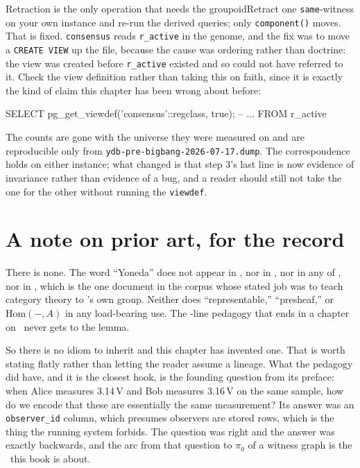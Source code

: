 \begin{Correspondence}{Retraction is the only operation that needs the groupoid}{Retract one \texttt{same}-witness on your own instance and re-run the derived queries; only \texttt{component()} moves.}
That is fixed. \texttt{consensus} reads \texttt{r\_active} in the genome, and the fix was to move a \texttt{CREATE VIEW} up the file, because the cause was ordering rather than doctrine: the view was created before \texttt{r\_active} existed and so could not have referred to it. Check the view definition rather than taking this on faith, since it is exactly the kind of claim this chapter has been wrong about before:

\begin{Check}
SELECT pg_get_viewdef('consensus'::regclass, true);   -- ... FROM r_active
\end{Check}

The counts are gone with the universe they were measured on and are reproducible only from \texttt{ydb-pre-bigbang-2026-07-17.dump}. The correspondence holds on either instance; what changed is that step 3's last line is now evidence of invariance rather than evidence of a bug, and a reader should still not take the one for the other without running the \texttt{viewdef}.
\end{Correspondence}

\section{A note on prior art, for the record}

There is none. The word ``Yoneda'' does not appear in \texttt{\labPriorDocA}, nor in \texttt{\labPriorDocB}, nor in any of \labPriorDrafts, nor in \texttt{\labPedagogyDoc}, which is the one document in the corpus whose stated job was to teach category theory to \labPI's own group. Neither does ``representable,'' ``presheaf,'' or $\mathrm{Hom}(-,A)$ in any load-bearing use. The \labPedagogyLines-line pedagogy that ends in a chapter on \labPedagogyEnd\ never gets to the lemma.

So there is no idiom to inherit and this chapter has invented one. That is worth stating flatly rather than letting the reader assume a lineage. What the pedagogy did have, and it is the closest hook, is the founding question from its preface: when Alice measures 3.14\,V and Bob measures 3.16\,V on the same sample, how do we encode that these are essentially the same measurement? Its answer was an \texttt{observer\_id} column, which presumes observers are stored rows, which is the thing the running system forbids. The question was right and the answer was exactly backwards, and the arc from that question to $\pi_0$ of a witness graph is the \labDuration\ this book is about.


